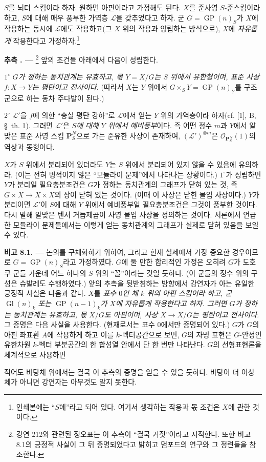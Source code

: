 \documentclass[11pt,twoside,openany]{book}
\numberwithin{equation}{section}
\newcommand{\sourceunit}{front}
\newcommand{\src}[1]{%
  \phantomsection\hypertarget{src:\sourceunit:#1}{}%
  \marginpar{\raggedleft\footnotesize\sffamily #1}%
}
\theoremstyle{plain}
\theoremstyle{definition}
\theoremstyle{remark}
\newcommand{\result}[2]{%
  \par\medskip\noindent\textbf{#1%
  \if\relax\detokenize{#2}\relax\else\space#2\fi. ---}\enspace
}
\begin{document}
$S$를 뇌터 스킴이라 하자. 원하면 아핀이라고 가정해도 된다. $X$를
준사영 $S$-준스킴이라 하고, $S$에 대해 매우 풍부한 가역층
$\mathcal L$을 갖추었다고 하자. 군 $G=\operatorname{GP}(n)_S$가 $X$에
작용하는 동시에 $\mathcal L$에도 작용하고(그 $X$ 위의 작용과 양립하는
방식으로), $X$에 \emph{자유롭게} 작용한다고 가정하자.\footnote{인쇄본에는
``$S$에''라고 되어 있다. 여기서 생각하는 작용과 몫 조건은 $X$에 관한
것이다.}
\src{117}

\result{추측}{8.1}\footnote{강연 212와 관련된 정오표는 이 추측이
``결국 거짓''이라고 지적한다. 또한 비고 8.1의 긍정적 사실이 그 뒤
증명되었다고 밝히고 멈포드의 연구와 그 정련들을 참조한다.} 앞의 조건들
아래에서 다음이 성립한다.

\smallskip
\noindent $1^\circ$ \emph{$G$가 정하는 동치관계는 유효하고, 몫
$Y=X/G$는 $S$ 위에서 유한형이며, 표준 사상 $f:X\to Y$는 평탄이고
전사이다.} (따라서 $X$는 $Y$ 위에서
$G\times_S Y=\operatorname{GP}(n)_Y$를 구조군으로 하는 동차 주다발이
된다.)

\smallskip
\noindent $2^\circ$ $\mathcal L'$을 $f$에 의한 ``충실 평탄 강하''로
$\mathcal L$에서 얻는 $Y$ 위의 가역층이라 하자(cf. [1], B,
\S~th. 1). 그러면 $\mathcal L'$은 \emph{$S$에 대해 $Y$ 위에서
예비풍부}이다. 즉 어떤 정수 $m$과 $Y$에서 알맞은 표준 사영 스킴
$\mathbf P_S^N$으로 가는 준유한 사상이 존재하여,
$(\mathcal L')^{\otimes m}$은 $\mathcal O_{\mathbf P_S^N}(1)$의 역상과
동형이다.

$X$가 $S$ 위에서 분리되어 있더라도 $Y$는 $S$ 위에서 분리되어 있지 않을
수 있음에 유의하라. (이는 전혀 병적이지 않은 ``모듈라이 문제''에서
나타나는 상황이다.) $1^\circ$가 성립하면 $Y$가 분리일 필요충분조건은
$G$가 정하는 동치관계의 그래프가 닫혀 있는 것, 즉
$G\times X\to X\times X$의 상이 닫혀 있는 것이다. (이때 이 사상은
닫힌 몰입 사상이다.) $Y$가 분리이면 $\mathcal L'$이 $S$에 대해 $Y$
위에서 예비풍부일 필요충분조건은 그것이 풍부한 것이다. 다시 말해
알맞은 텐서 거듭제곱이 사영 몰입 사상을 정의하는 것이다. 서론에서
언급한 모듈라이 문제들에서는 이렇게 얻는 동치관계의 그래프가 실제로
닫혀 있음을 보일 수 있다.

\medskip
\noindent\textbf{비고 8.1. ---} 논의를 구체화하기 위하여, 그리고 현재
실제에서 가장 중요한 경우이므로 $G=\operatorname{GP}(n)_S$라고
가정하였다. $G$에 둘 만한 합리적인 가정은 오히려 $G$가 도호쿠 군들
가운데 어느 하나의 $S$ 위의 ``꼴''이라는 것일 듯하다. (이 군들의
정수 위의 구성은 슈발레도 수행하였다.) 앞의 추측을 뒷받침하는 방향에서
강연자가 아는 유일한 긍정적 사실은 다음과 같다. $X$를 \emph{표수 $0$인
체 $k$ 위의 아핀 스킴이라 하고, 군 $\operatorname{Gl}(n)_k$ 또는
$\operatorname{GP}(n-1)_k$가 $X$에 자유롭게 작용한다고 하자. 그러면
$G$가 정하는 동치관계는 유효하고, 몫 $X/G$도 아핀이며, 사상
$X\to X/G$는 평탄이고 전사이다.} 그 증명은 다음 사실을 사용한다.
(현재로서는 표수 $0$에서만 증명되어 있다.) $G$가 $G$의 아핀 좌표환
$A$에 작용하게 하고 이를 $k$-벡터공간으로 보면, $G$의 자명 표현은
$G$-안정인 유한차원 $k$-벡터 부분공간의 한 합성열 안에서 단 한 번만
나타난다. $G$의 선형표현론을 체계적으로 사용하면
\src{118}
적어도 바탕체 위에서는 결국 이 추측의 증명을 얻을 수 있을 듯하다.
바탕이 더 이상 체가 아니면 강연자는 아무것도 알지 못한다.
\end{document}
